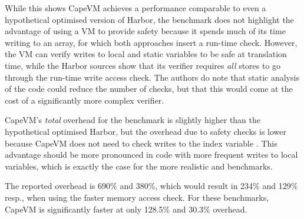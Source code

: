 While this shows CapeVM achieves a performance comparable to even a hypothetical optimised version of Harbor, the  benchmark does not highlight the advantage of using a VM to provide safety because it spends much of its time writing to an array, for which both approaches insert a run-time check. However, the VM can verify writes to local and static variables to be safe at translation time, while the Harbor sources \cite{sos-operating-system} show that its verifier requires \emph{all} stores to go through the run-time write access check. The authors do note that static analysis of the code could reduce the number of checks, but that this would come at the cost of a significantly more complex verifier.

CapeVM's \emph{total} overhead for the  benchmark is slightly higher than the hypothetical optimised Harbor, but the overhead due to safety checks is lower because CapeVM does not need to check writes to the index variable . This advantage should be more pronounced in code with more frequent writes to local variables, which is exactly the case for the more realistic  and  benchmarks. 

The reported overhead is 690\% and 380\%, which would result in 234\% and 129\% resp., when using the faster memory access check. For these benchmarks, CapeVM is significantly faster at only 128.5\% and 30.3\% overhead.
